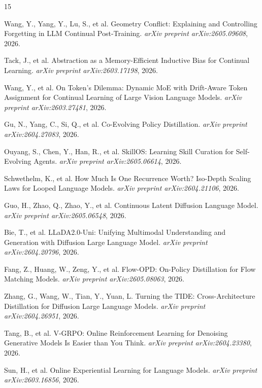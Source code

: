 \documentclass[11pt]{article}
\begin{document}
\begin{thebibliography}{15}

Wang, Y., Yang, Y., Lu, S., et al.
\newblock Geometry Conflict: Explaining and Controlling Forgetting in LLM Continual Post-Training.
\newblock \emph{arXiv preprint arXiv:2605.09608}, 2026.

Tack, J., et al.
\newblock Abstraction as a Memory-Efficient Inductive Bias for Continual Learning.
\newblock \emph{arXiv preprint arXiv:2603.17198}, 2026.

Wang, Y., et al.
\newblock On Token's Dilemma: Dynamic MoE with Drift-Aware Token Assignment for Continual Learning of Large Vision Language Models.
\newblock \emph{arXiv preprint arXiv:2603.27481}, 2026.

Gu, N., Yang, C., Si, Q., et al.
\newblock Co-Evolving Policy Distillation.
\newblock \emph{arXiv preprint arXiv:2604.27083}, 2026.

Ouyang, S., Chen, Y., Han, R., et al.
\newblock SkillOS: Learning Skill Curation for Self-Evolving Agents.
\newblock \emph{arXiv preprint arXiv:2605.06614}, 2026.

Schwethelm, K., et al.
\newblock How Much Is One Recurrence Worth? Iso-Depth Scaling Laws for Looped Language Models.
\newblock \emph{arXiv preprint arXiv:2604.21106}, 2026.

Guo, H., Zhao, Q., Zhao, Y., et al.
\newblock Continuous Latent Diffusion Language Model.
\newblock \emph{arXiv preprint arXiv:2605.06548}, 2026.

Bie, T., et al.
\newblock LLaDA2.0-Uni: Unifying Multimodal Understanding and Generation with Diffusion Large Language Model.
\newblock \emph{arXiv preprint arXiv:2604.20796}, 2026.

Fang, Z., Huang, W., Zeng, Y., et al.
\newblock Flow-OPD: On-Policy Distillation for Flow Matching Models.
\newblock \emph{arXiv preprint arXiv:2605.08063}, 2026.

Zhang, G., Wang, W., Tian, Y., Yuan, L.
\newblock Turning the TIDE: Cross-Architecture Distillation for Diffusion Large Language Models.
\newblock \emph{arXiv preprint arXiv:2604.26951}, 2026.

Tang, B., et al.
\newblock V-GRPO: Online Reinforcement Learning for Denoising Generative Models Is Easier than You Think.
\newblock \emph{arXiv preprint arXiv:2604.23380}, 2026.

Sun, H., et al.
\newblock Online Experiential Learning for Language Models.
\newblock \emph{arXiv preprint arXiv:2603.16856}, 2026.

\end{thebibliography}
\end{document}
